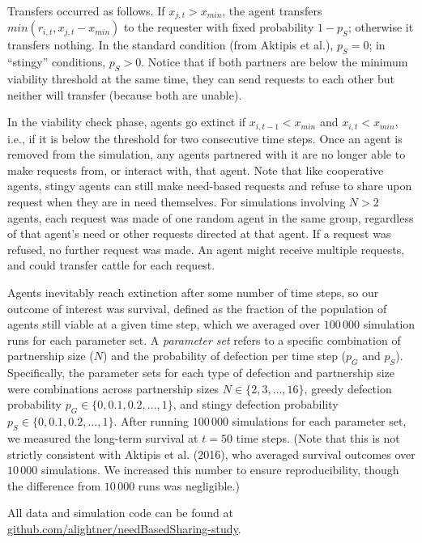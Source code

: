 \documentclass[
]{article}
\begin{document}
Transfers occurred as follows. If \(x_{j,t}>x_{min}\), the agent transfers \(min(r_{i,t}, x_{j,t}-x_{min})\) to the requester with fixed probability \(1 - p_S\); otherwise it transfers nothing. In the standard condition (from Aktipis et al.), \(p_S=0\); in ``stingy'' conditions, \(p_S>0\). Notice that if both partners are below the minimum viability threshold at the same time, they can send requests to each other but neither will transfer (because both are unable).

In the viability check phase, agents go extinct if \(x_{i,t-1}<x_{min}\) and \(x_{i,t}<x_{min}\), i.e., if it is below the threshold for two consecutive time steps. Once an agent is removed from the simulation, any agents partnered with it are no longer able to make requests from, or interact with, that agent. Note that like cooperative agents, stingy agents can still make need-based requests and refuse to share upon request when they are in need themselves. For simulations involving \(N>2\) agents, each request was made of one random agent in the same group, regardless of that agent's need or other requests directed at that agent. If a request was refused, no further request was made. An agent might receive multiple requests, and could transfer cattle for each request.

Agents inevitably reach extinction after some number of time steps, so our outcome of interest was survival, defined as the fraction of the population of agents still viable at a given time step, which we averaged over \(100\,000\) simulation runs for each parameter set. A \emph{parameter set} refers to a specific combination of partnership size (\(N\)) and the probability of defection per time step (\(p_G\) and \(p_S\)). Specifically, the parameter sets for each type of defection and partnership size were combinations across partnership sizes \(N \in \{ 2, 3, \dots, 16 \}\), greedy defection probability \(p_G \in \{0, 0.1, 0.2, \dots, 1\}\), and stingy defection probability \(p_S \in \{0, 0.1, 0.2, \dots, 1\}\). After running \(100\,000\) simulations for each parameter set, we measured the long-term survival at \(t=50\) time steps. (Note that this is not strictly consistent with Aktipis et al. (2016), who averaged survival outcomes over \(10\,000\) simulations. We increased this number to ensure reproducibility, though the difference from \(10\,000\) runs was negligible.)

All data and simulation code can be found at \href{https://github.com/alightner/needBasedSharing-study}{github.com/alightner/needBasedSharing-study}.
\end{document}
